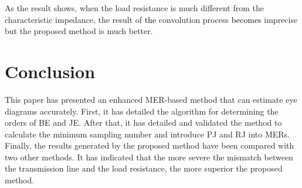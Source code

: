 \documentclass[conference]{IEEEtran}
\begin{document}
As the result shows,
\color{black}
when the load resistance is much different from the characteristic impedance, the result of \textcolor{black}{the} convolution process \textcolor{black}{becomes} imprecise but the proposed method is much better.

\section{Conclusion}\label{VI}

\color{black}
This paper has presented an enhanced MER-based method that can estimate eye diagrams accurately. First, it has detailed the algorithm for determining the orders of BE and JE. After that, it has detailed and validated the method to calculate the minimum sampling number and introduce PJ and RJ into MERs. Finally, the results generated by the proposed method have been compared with two other methods. It has indicated that
\color{black}
the more severe the mismatch between the transmission line and the load resistance, the more superior the proposed method.

\end{document}
